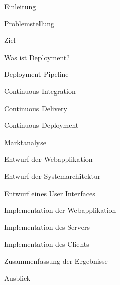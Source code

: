 \documentclass{scrartcl}
\begin{document}
\begin{tocpreview}
  \item Einleitung
    \begin{tocpreview}
      \item Problemstellung
      \item Ziel
    \end{tocpreview}
  \item Was ist Deployment?
    \begin{tocpreview}
      \item Deployment Pipeline
      \item Continuous Integration
      \item Continuous Delivery
      \item Continuous Deployment
    \end{tocpreview}
  \item Marktanalyse
  \item Entwurf der Webapplikation
    \begin{tocpreview}
      \item Entwurf der Systemarchitektur
      \item Entwurf eines User Interfaces
    \end{tocpreview}
  \item Implementation der Webapplikation
    \begin{tocpreview}
      \item Implementation des Servers
      \item Implementation des Clients
    \end{tocpreview}
  \item Zusammenfassung der Ergebnisse
  \item Ausblick
\end{tocpreview}




\end{document}
